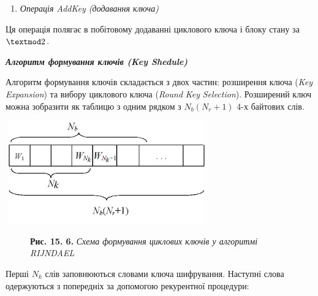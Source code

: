 \bigskip


\bigskip

\liststyleWWviiiNumxxxi
\setcounter{saveenum}{\value{enumi}}
\begin{enumerate}
\setcounter{enumi}{\value{saveenum}}
\item {\itshape
Операція AddKey (додавання ключа)}
\end{enumerate}

\bigskip

Ця операція полягає в побітовому додаванні циклового ключа і блоку стану за 
$\textmod2$. 


\bigskip


\bigskip

{\centering\bfseries\itshape
Алгоритм формування ключів (Key Shedule)
\par}


\bigskip


\bigskip

Алгоритм формування ключів складається з двох частин: розширення ключа
(\textit{Key}\textit{ }\textit{Expansion}) та вибору циклового ключа
(\textit{Round}\textit{ }\textit{Key}\textit{ }\textit{Selection}). Розширений
ключ можна зобразити як таблицю з одним рядком з  $N_{b}(N_r+1)$ 4-х
байтових слів. 


\bigskip

{\centering  $ $
\includegraphics[width=3.3437in,height=1.75in]{crypt-img/crypt-img335.png}
\par}

{\centering \par}

\begin{figure}
\centering
\begin{minipage}{}
{\centering
\textbf{Рис. 15. 6.} \textit{Схема формування циклових ключів у алгоритмі
}\textit{RIJNDAEL}
\par}
\end{minipage}
\end{figure}
Перші  $N_k$ слів заповнюються словами ключа шифрування. Наступні слова
одержуються з попередніх за допомогою рекурентної процедури:

